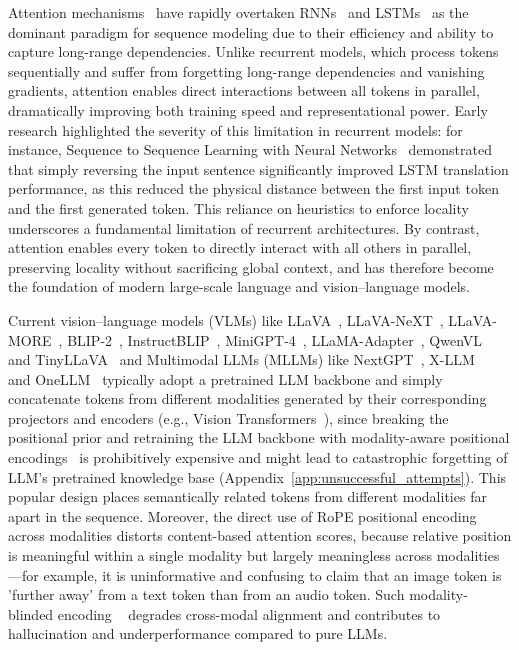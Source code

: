 \documentclass[11pt]{article}
\begin{document}
Attention mechanisms~\citep{vaswani2017attention} have rapidly overtaken RNNs~\citep{rumelhart1986learning} and LSTMs~\citep{graves2012long} as the dominant paradigm for sequence modeling due to their efficiency and ability to capture long-range dependencies. Unlike recurrent models, which process tokens sequentially and suffer from forgetting long-range dependencies and vanishing gradients, attention enables direct interactions between all tokens in parallel, dramatically improving both training speed and representational power. Early research highlighted the severity of this limitation in recurrent models: for instance, Sequence to Sequence Learning with Neural Networks~\citep{sutskever2014sequence} demonstrated that simply reversing the input sentence significantly improved LSTM translation performance, as this reduced the physical distance between the first input token and the first generated token. This reliance on heuristics to enforce locality underscores a fundamental limitation of recurrent architectures. By contrast, attention enables every token to directly interact with all others in parallel, preserving locality without sacrificing global context, and has therefore become the foundation of modern large-scale language and vision–language models.

Current vision–language models (VLMs) like LLaVA~\citep{liu2023llava}, LLaVA-NeXT~\citep{liu2024llavanext}, LLaVA-MORE~\citep{liu2024llavamore}, BLIP-2~\citep{li2023blip2}, InstructBLIP~\citep{dai2023instructblip}, MiniGPT-4~\citep{zhu2023minigpt}, LLaMA-Adapter~\citep{zhang2023llama}, QwenVL~\citep{wang2024qwen2} and TinyLLaVA~\citep{wang2023tinyllava} and Multimodal LLMs (MLLMs) like NextGPT~\citep{wu2024next}, X-LLM ~\citep{chen2023x} and OneLLM~\citep{han2024onellm} typically adopt a pretrained LLM backbone and simply concatenate tokens from different modalities generated by their corresponding projectors and encoders  (e.g., Vision Transformers~\citep{dosovitskiy2020image}), since breaking the positional prior and retraining the LLM backbone with modality-aware positional encodings~\citep{wang2025circle}  is prohibitively expensive and might lead to catastrophic forgetting of LLM's pretrained knowledge base (Appendix~\ref{app:unsuccessful_attempts}). This popular design places semantically related tokens from different modalities far apart in the sequence. Moreover, the direct use of RoPE positional encoding~\citep{su2024roformer} across modalities distorts content-based attention scores, because relative position is meaningful within a single modality but largely meaningless across modalities—for example, it is uninformative and confusing to claim that an image token is 'further away' from a text token than from an audio token. Such modality-blinded encoding ~\citep{press2021alibi, chen2023extending, sun2022length} degrades cross-modal alignment and contributes to hallucination and underperformance compared to pure LLMs.
\end{document}
